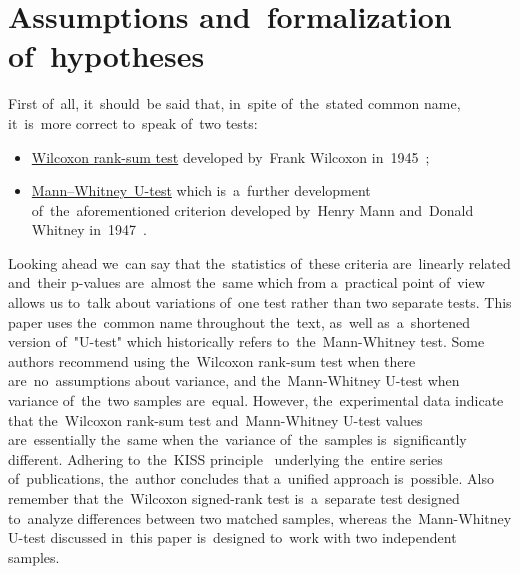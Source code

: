 \documentclass[]{scrreprt}
\begin{document}
\section{Assumptions and~formalization of~hypotheses}
First of~all, it~should~be said that, in~spite of~the~stated common name, it~is~more correct to~speak of~two tests:
\begin{itemize}
	\item \href{http://www.machinelearning.ru/wiki/index.php?title=Критерий_Уилкоксона_двухвыборочный}{Wilcoxon rank-sum test} developed by~Frank Wilcoxon in~1945~\cite{MLRU:Wilcoxon-test};
	\item \href{http://www.machinelearning.ru/wiki/index.php?title=Критерий_Уилкоксона-Манна"--~Уитни}{Mann--Whitney~U-test} which is~a~further development of~the~aforementioned criterion developed by~Henry Mann and~Donald Whitney in~1947~\cite{MLRU:Mann-Whitney}.
\end{itemize}
Looking ahead we~can say that the~statistics of~these criteria are~linearly related and~their p-values are~almost the~same which from a~practical point of~view allows us to~talk about variations of~one test rather than two separate tests. This paper uses the~common name throughout the~text, as~well as~a~shortened version of~"U-test" which historically refers to~the~Mann-Whitney test. Some authors\cite{Kobzarq-prikl-mathstat} recommend using the~Wilcoxon rank-sum test when there are~no~assumptions about variance, and the~Mann-Whitney U-test when variance of~the~two samples are~equal. However, the~experimental data indicate that the~Wilcoxon rank-sum test and~Mann-Whitney U-test values are~essentially the~same when the~variance of~the~samples is~significantly different. Adhering to~the~KISS principle~\cite{KISS-principle} underlying the~entire series of~publications, the~author concludes that a~unified approach is~possible. Also remember that the~Wilcoxon signed-rank test is~a~separate test designed to~analyze differences between two matched samples, whereas the~Mann-Whitney U-test discussed in~this paper is~designed to~work with two independent samples.
\end{document}
